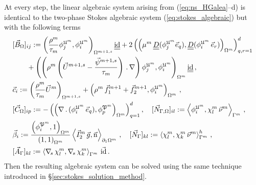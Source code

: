 At every step, the linear algebraic system arising from (\ref{eq:ns_HGalea}--d)
is identical to the two-phase Stokes algebraic system
(\ref{eq:stokes_algebraic}) but with the following terms
\begin{align*}
& [\vec B_\Omega]_{ij} := \left( \frac{\rho^m}{\tau_m}
\phi_j^{\uspacesimpleale^m},
\phi_i^{\uspacesimpleale^m} \right)_{\Omega^{m+1,s}}\mat \id
+ 2\left(\left(\mu^m\,\mat D(\phi_j^{\uspacesimpleale^m} \vec e_q),
\mat D(\phi_i^{\uspacesimpleale^m}\,\vec e_r)\right)_{\Omega^m}
\right)_{q,r=1}^d\\
& \qquad + \left( \left(\rho^m \left(\vec U^{m+1,s} -
\frac{\vec \psi^{m+1,s}}{\tau_m}\right)\,.\,\nabla \right)
\phi_j^{\uspacesimpleale^m},\phi_i^{\uspacesimpleale^m}
\right)_{\Omega^m}\mat \id \,,\\
& \vec c_i := \left( \frac{\rho^m}{\tau_m}\vec U^m \right)_{\Omega^{m+1,s}}
+ \left(\rho^m\,\vec f_1^{m+1}+\vec f_2^{m+1},
\phi_i^{\uspacesimpleale^m}\right)_{\Omega^m}\,,\\
& [\vec C_\Omega]_{ip} := - \left(
\left(\nabla\,.\,(\phi_i^{\uspacesimpleale^m}\,\vec
e_q), \phi_p^{\pspaceale^m} \right)_{\Omega^m} \right)_{q=1}^d,\quad
[\Nbulk]_{il} := \left\langle \phi_i^{\uspacesimpleale^m}, \chi^m_l \,\vec\nu^m
\right\rangle_{\Gamma^m} \,,\\
& \vec \beta_i :=
\frac{\left(\phi_i^{\pspaceale^m},1\right)_{\Omega^m}}{\left(1,1\right)
_{\Omega^m}} \left\langle \vec I_2^m\,\vec
g,\unitn\right\rangle_{\partial_1\Omega^m}\,,\quad
[\vec N_\Gamma]_{kl} := \left\langle \chi^m_l, \chi^m_k\,\vec\nu^m
\right\rangle_{\Gamma^m}^h \,,\\
& [\vec A_\Gamma]_{kl} := \left\langle \nabs\,\chi^m_l, \nabs\,\chi^m_k
\right\rangle_{\Gamma^m} \,\vec\id \,.
\end{align*}
Then the resulting algebraic system can be solved using the same technique
introduced in \S\ref{sec:stokes_solution_method}.
